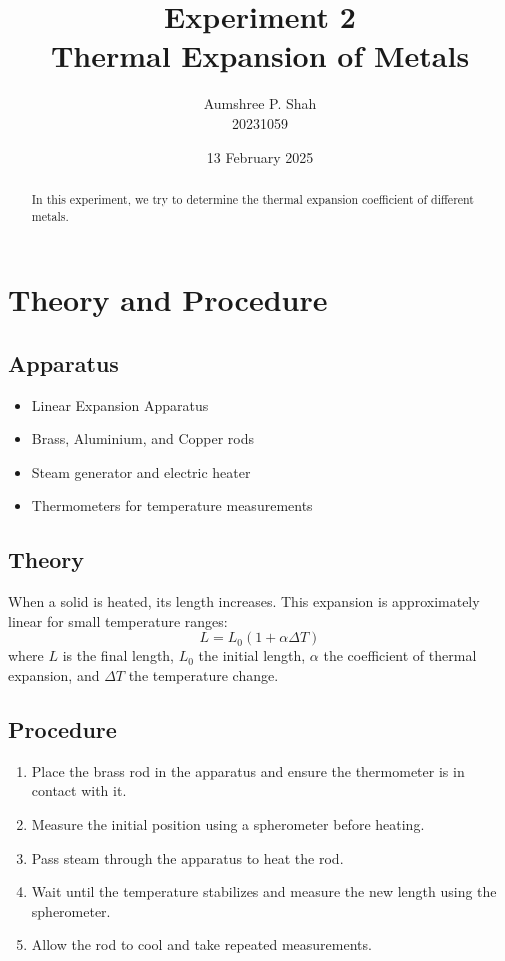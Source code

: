\documentclass[%
 sor,
 jor,
 amsmath,amssymb,
 reprint,
]{revtex4-2}
\begin{document}
\title{Experiment 2\\Thermal Expansion of Metals}

\author{Aumshree P. Shah\\20231059}
\date{13 February 2025}

\begin{abstract}
\centering
In this experiment, we try to determine the thermal expansion coefficient of different metals.
\end{abstract}

\maketitle

\section{Theory and Procedure}
\subsection{Apparatus}
\small
\begin{itemize}
    \item Linear Expansion Apparatus
    \item Brass, Aluminium, and Copper rods
    \item Steam generator and electric heater
    \item Thermometers for temperature measurements
\end{itemize}

\subsection{Theory}
When a solid is heated, its length increases. This expansion is approximately linear for small temperature ranges:
\[
L = L_0 (1 + \alpha \Delta T)
\]
where $L$ is the final length, $L_0$ the initial length, $\alpha$ the coefficient of thermal expansion, and $\Delta T$ the temperature change.

\subsection{Procedure}
\begin{enumerate}
    \item Place the brass rod in the apparatus and ensure the thermometer is in contact with it.
    \item Measure the initial position using a spherometer before heating.
    \item  Pass steam through the apparatus to heat the rod.
    \item  Wait until the temperature stabilizes and measure the new length using the spherometer.
    \item Allow the rod to cool and take repeated measurements.
\end{enumerate}
\pagebreak
\end{document}
